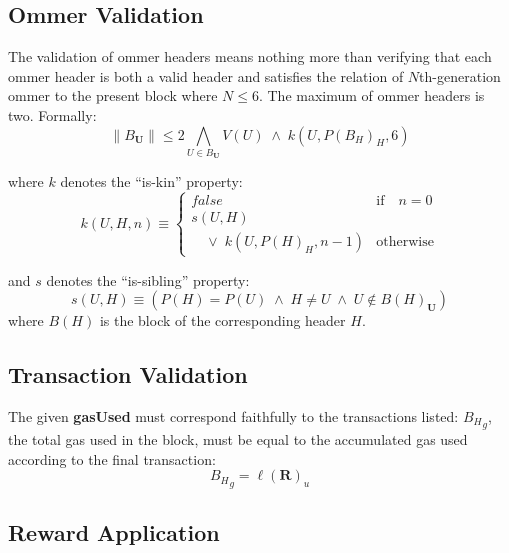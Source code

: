 \documentclass[9pt,oneside]{amsart}
\begin{document}
\begin{multicols}{2}
\subsection{Ommer Validation}

The validation of ommer headers means nothing more than verifying that each ommer header is both a valid header and satisfies the relation of $N$th-generation ommer to the present block where $N \leq 6$. The maximum of ommer headers is two. Formally:
\begin{equation}
\lVert B_\mathbf{U} \rVert \leqslant 2 \bigwedge_{U \in B_\mathbf{U}} V(U) \; \wedge \; k(U, P(B_H)_H, 6)
\end{equation}

where $k$ denotes the ``is-kin'' property:
\begin{equation}
k(U, H, n) \equiv \begin{cases} false & \text{if} \quad n = 0 \\
s(U, H) &\\
\quad \vee \; k(U, P(H)_H, n - 1) & \text{otherwise}
\end{cases}
\end{equation}

and $s$ denotes the ``is-sibling'' property:
\begin{equation}
s(U, H) \equiv (P(H) = P(U)\; \wedge \; H \neq U \; \wedge \; U \notin B(H)_\mathbf{U})
\end{equation}
where $B(H)$ is the block of the corresponding header $H$.

\subsection{Transaction Validation}


The given \textbf{gasUsed} must correspond faithfully to the transactions listed: ${B_H}_g$, the total gas used in the block, must be equal to the accumulated gas used according to the final transaction:
\begin{equation}
{B_H}_g = \ell(\mathbf{R})_u
\end{equation}

\subsection{Reward Application}


\end{multicols}
\end{document}
